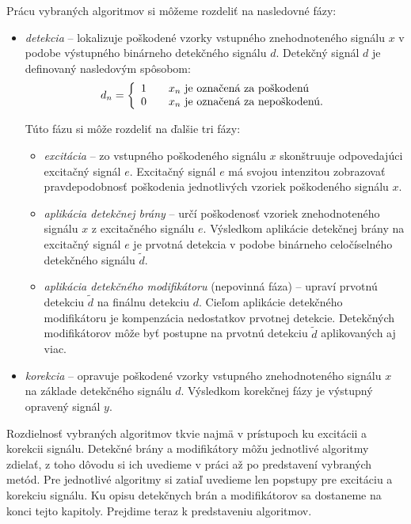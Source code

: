 Prácu vybraných algoritmov si môžeme rozdeliť na nasledovné fázy: 
\begin{itemize}
	\item \textit{detekcia} -- lokalizuje poškodené vzorky vstupného znehodnoteného signálu $x$ v podobe výstupného binárneho detekčného signálu $d$. Detekčný signál $d$ je definovaný nasledovým spôsobom:
	$$d_n = \left\{\begin{array}{l l}
		1 & \quad \text{$x_n$ je označená za poškodenú}\\
		0 & \quad \text{$x_n$ je označená za nepoškodenú.}\\
	\end{array} \right.$$
	
	Túto fázu si môže rozdeliť na ďalšie tri fázy:
	\begin{itemize}
		\item \textit{excitácia} -- zo vstupného poškodeného signálu $x$ skonštruuje odpovedajúci excitačný signál $e$. Excitačný signál $e$ má svojou intenzitou zobrazovať pravdepodobnosť poškodenia jednotlivých vzoriek poškodeného signálu $x$.
		\item \textit{aplikácia detekčnej brány} -- určí poškodenosť vzoriek znehodnoteného signálu $x$ z excitačného signálu $e$. Výsledkom aplikácie detekčnej brány na excitačný signál $e$ je prvotná detekcia v podobe binárneho celočíselného detekčného signálu $\tilde{d}$.
		\item \textit{aplikácia detekčného modifikátoru} (nepovinná fáza) -- upraví prvotnú detekciu $\tilde{d}$ na finálnu detekciu $d$. Cieľom aplikácie detekčného modifikátoru je kompenzácia nedostatkov prvotnej detekcie. Detekčných modifikátorov môže byť postupne na prvotnú detekciu $\tilde{d}$ aplikovaných aj viac.
	\end{itemize}
	\item \textit{korekcia} -- opravuje poškodené vzorky vstupného znehodnoteného signálu $x$ na základe detekčného signálu $d$. Výsledkom korekčnej fázy je výstupný opravený signál $y$.
\end{itemize}

Rozdielnosť vybraných algoritmov tkvie najmä v prístupoch ku excitácii a korekcii signálu. Detekčné brány a modifikátory môžu jednotlivé algoritmy zdielať, z toho dôvodu si ich uvedieme v práci až po predstavení vybraných metód. Pre jednotlivé algoritmy si zatiaľ uvedieme len popstupy pre excitáciu a korekciu signálu. Ku opisu detekčnych brán a modifikátorov sa dostaneme na konci tejto kapitoly. Prejdime teraz k predstaveniu algoritmov.

